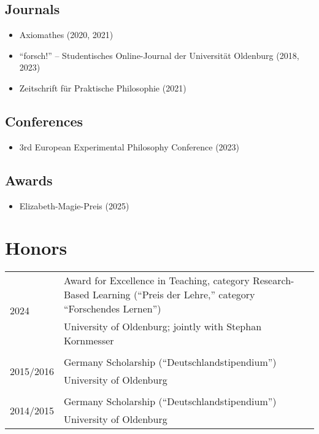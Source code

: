 \documentclass[a4paper,10pt]{article}
\begin{document}
\subsection*{Journals}
\begin{itemize}
   \item Axiomathes (2020, 2021)
   \item \enquote{forsch!} -- Studentisches Online-Journal der Universität Oldenburg (2018, 2023)
   \item Zeitschrift für Praktische Philosophie (2021)
\end{itemize}


\subsection*{Conferences}
\begin{itemize}
   \item 3rd European Experimental Philosophy Conference (2023)
\end{itemize}


\subsection*{Awards}
\begin{itemize}
   \item Elizabeth-Magie-Preis (2025)
\end{itemize}


\clearpage
\section{Honors}
\begin{longtable}{p{2.5cm}p{11cm}}
\multirow{2}{2.5cm}{\footnotesize{2024}} & Award for Excellence in Teaching, category Research-Based Learning (\enquote{Preis der Lehre,} category \enquote{Forschendes Lernen})\\
& \footnotesize{University of Oldenburg; jointly with Stephan Kornmesser}\\
\\
\multirow{2}{2.5cm}{\footnotesize{2015/2016}} & Germany Scholarship (\enquote{Deutschlandstipendium})\\
& \footnotesize{University of Oldenburg}\\
\\
\multirow{2}{2.5cm}{\footnotesize{2014/2015}} & Germany Scholarship (\enquote{Deutschlandstipendium})\\
& \footnotesize{University of Oldenburg}\\
\end{longtable}
\end{document}

